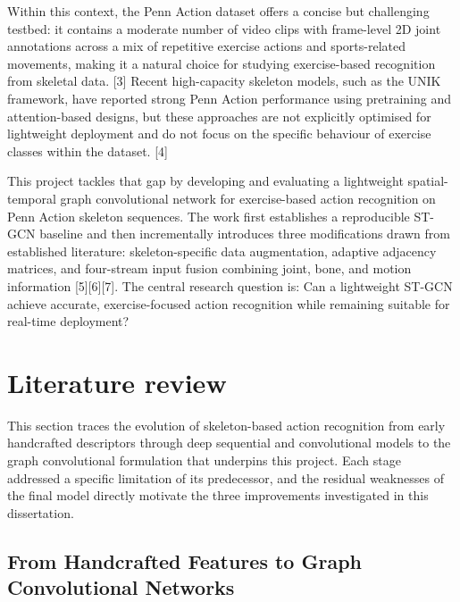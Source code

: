 Within this context, the Penn Action dataset offers a concise but challenging testbed: it contains a moderate number of video clips with frame-level 2D joint annotations across a mix of repetitive exercise actions and sports-related movements, making it a natural choice for studying exercise-based recognition from skeletal data. [3] Recent high-capacity skeleton models, such as the UNIK framework, have reported strong Penn Action performance using pretraining and attention-based designs, but these approaches are not explicitly optimised for lightweight deployment and do not focus on the specific behaviour of exercise classes within the dataset. [4]

This project tackles that gap by developing and evaluating a lightweight spatial-temporal graph convolutional network for exercise-based action recognition on Penn Action skeleton sequences. The work first establishes a reproducible ST-GCN baseline and then incrementally introduces three modifications drawn from established literature: skeleton-specific data augmentation, adaptive adjacency matrices, and four-stream input fusion combining joint, bone, and motion information [5][6][7]. The central research question is: Can a lightweight ST-GCN achieve accurate, exercise-focused action recognition while remaining suitable for real-time deployment?


\section{Literature review}
This section traces the evolution of skeleton-based action recognition from early handcrafted descriptors through deep sequential and convolutional models to the graph convolutional formulation that underpins this project. Each stage addressed a specific limitation of its predecessor, and the residual weaknesses of the final model directly motivate the three improvements investigated in this dissertation.
\subsection{From Handcrafted Features to Graph Convolutional Networks}

